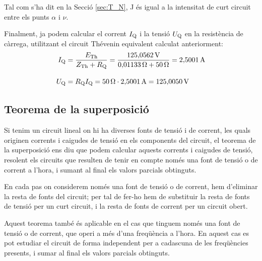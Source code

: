 \begin{exemple}
Tal com s'ha dit en la Secci\'{o} \ref{sec:T_N}, J \'{e}s igual a la
intensitat de curt circuit entre els punts $\alpha$ i $\nu$.

Finalment, ja podem calcular el corrent $I_\mathrm{Q}$ i la tensi\'{o} $U_\mathrm{Q}$ en la
resist\`{e}ncia de c\`{a}rrega, utilitzant el circuit Th\'{e}venin equivalent calculat anteriorment:
\begin{align*}
    I_\mathrm{Q} &= \frac{E_\mathrm{Th}}{Z_\mathrm{Th} + R_\mathrm{Q}} = \frac{125{,}0562\mathrm{\,V}}
    {0{,}01133\mathrm{\,\mathrm{\Omega}} + 50\mathrm{\,\mathrm{\Omega}}} = 2{,}5001\mathrm{\,A} \\[2ex]
    U_\mathrm{Q} &=  R_\mathrm{Q} I_\mathrm{Q} = 50\mathrm{\,\mathrm{\Omega}} \cdot 2{,}5001\mathrm{\,A} =
    125{,}0050\mathrm{\,V}
\end{align*}

\end{exemple}

\subsection{Teorema de la superposici\'{o}}

Si tenim un circuit lineal on hi ha diverses fonts de tensi\'{o} i  de
corrent, les quals originen corrents i caigudes de tensi\'{o} en els
components del circuit, el teorema de la superposici\'{o} ens diu que
podem calcular aquests corrents i caigudes de tensi\'{o}, resolent els
circuits que resulten de tenir en compte  nom\'{e}s una font de tensi\'{o} o
de corrent a l'hora, i sumant al final els valors parcials
obtinguts.

En cada pas on considerem nom\'{e}s una font de tensi\'{o} o de corrent, hem
d'eliminar la resta de fonts del circuit; per tal de fer-ho hem de
substituir la resta de fonts de tensi\'{o} per un curt circuit, i la
resta de fonts de corrent per un circuit obert.

Aquest teorema tamb\'{e} \'{e}s aplicable en el cas que tinguem nom\'{e}s una
font de tensi\'{o} o de corrent, que operi a m\'{e}s d'una freq\"{u}\`{e}ncia a
l'hora. En aquest cas es pot estudiar el circuit de forma
independent per a cadascuna de les freq\"{u}\`{e}ncies presents, i sumar al
final els valors parcials obtinguts.

